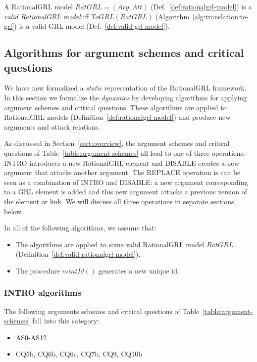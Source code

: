 \begin{definition}
\label{def:valid-rationalgrl-model}
A RationalGRL model $RatGRL = (Arg, Att)$ (Def.~\ref{def:rationalgrl-model})
is a \emph{valid RationalGRL model} iff $ToGRL(RatGRL)$ (Algorithm~\ref{alg:translation:to-grl}) is a valid GRL model (Def.~\ref{def:valid-grl-model}).
\end{definition}


\subsection{Algorithms for argument schemes and critical questions}
\label{sect:algorithms}

We have now formalized a \emph{static} representation of the RationalGRL framework. In this section we formalize the \emph{dynamics} by developing algorithms for applying argument schemes and critical questions. These algorithms are applied to RationalGRL models (Definition~\ref{def:rationalgrl-model}) and produce new arguments and attack relations. 

As discussed in Section~\ref{sect:overview}, the argument schemes and critical questions of Table~\ref{table:argument-schemes} all lead to one of three operations: \textsf{INTRO}
introduces a new RationalGRL element and \textsf{DISABLE} creates a new argument that attacks another argument. The \textsf{REPLACE} operation is can be seen as a combination of \textsf{INTRO} and \textsf{DISABLE}: a new argument corresponding to a GRL element is added and this new argument attacks a previous version of the element or link. We will discuss all three operations in separate sections below.

In all of the following algorithms, we assume that:
\begin{itemize}
\item The algorithms are applied to some valid RationalGRL model $RatGRL$ (Definition~\ref{def:valid-rationalgrl-model}),
\item The procedure $mintId()$ generates a new unique id.
\end{itemize}

\subsubsection{INTRO algorithms}
\label{sect:formalframework:intro}

The following arguments schemes and critical questions of Table~\ref{table:argument-schemes} fall into this category:
\begin{itemize}
\item AS0-AS12
\item CQ5b, CQ6b, CQ6c, CQ7b, CQ9, CQ10b
\end{itemize}

